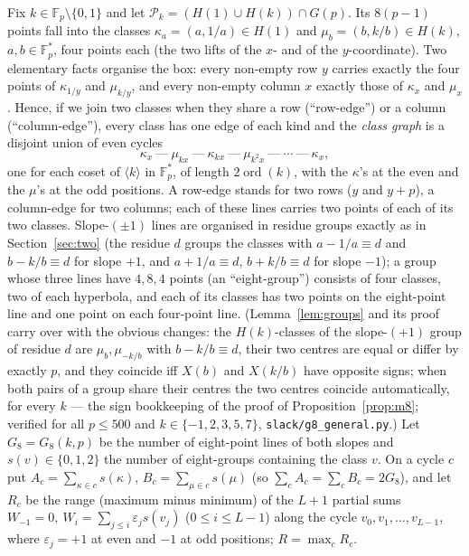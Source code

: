 \documentclass[11pt]{article}
\theoremstyle{remark}
\newcommand{\Fp}{\mathbb{F}_p}
\newcommand{\Gp}{G(p)}
\newcommand{\Pset}{\mathcal{P}}
\begin{document}
Fix $k\in\Fp\setminus\{0,1\}$ and let $\Pset_k=(H(1)\cup H(k))\cap\Gp$.  Its $8(p-1)$ points fall into the classes
$\kappa_a=(a,1/a)\in H(1)$ and $\mu_b=(b,k/b)\in H(k)$, $a,b\in\Fp^*$, four points each (the two lifts of the $x$- and of the
$y$-coordinate).  Two elementary facts organise the box: every non-empty row $y$ carries exactly the four points of $\kappa_{1/y}$ and
$\mu_{k/y}$, and every non-empty column $x$ exactly those of $\kappa_x$ and $\mu_x$.  Hence, if we join two classes when they share a row
(``row-edge'') or a column (``column-edge''), every class has one edge of each kind and the \emph{class graph} is a disjoint union of even
cycles
\[
 \kappa_x\ \text{---}\ \mu_{kx}\ \text{---}\ \kappa_{kx}\ \text{---}\ \mu_{k^2x}\ \text{---}\ \cdots\ \text{---}\ \kappa_x ,
\]
one for each coset of $\langle k\rangle$ in $\Fp^*$, of length $2\operatorname{ord}(k)$, with the $\kappa$'s at the even and the $\mu$'s at
the odd positions.  A row-edge stands for two rows ($y$ and $y+p$), a column-edge for two columns; each of these lines carries two points of
each of its two classes.  Slope-$(\pm1)$ lines are organised in residue groups exactly as in Section~\ref{sec:two} (the residue $d$ groups the
classes with $a-1/a\equiv d$ and $b-k/b\equiv d$ for slope $+1$, and $a+1/a\equiv d$, $b+k/b\equiv d$ for slope $-1$); a group whose three
lines have $4,8,4$ points (an ``eight-group'') consists of four classes, two of each hyperbola, and each of its classes has two points on the
eight-point line and one point on each four-point line.  (Lemma~\ref{lem:groups} and its proof carry over with the obvious changes: the $H(k)$-classes of the slope-$(+1)$ group of residue
$d$ are $\mu_b,\mu_{-k/b}$ with $b-k/b\equiv d$, their two centres are equal or differ by exactly $p$, and they coincide iff $X(b)$ and
$X(k/b)$ have opposite signs; when both pairs of a group share their centres the two centres coincide automatically, for every $k$ ---
the sign bookkeeping of the proof of Proposition~\ref{prop:m8}; verified for all $p\le500$ and $k\in\{-1,2,3,5,7\}$, \texttt{slack/g8\_general.py}.)  Let
$G_8=G_8(k,p)$ be the number of eight-point lines of both slopes and $s(v)\in\{0,1,2\}$ the number of eight-groups containing the class $v$.
On a cycle $c$ put $A_c=\sum_{\kappa\in c}s(\kappa)$, $B_c=\sum_{\mu\in c}s(\mu)$ (so $\sum_cA_c=\sum_cB_c=2G_8$), and let $R_c$ be the range
(maximum minus minimum) of the $L+1$ partial sums $W_{-1}=0,\ W_i=\sum_{j\le i}\varepsilon_js(v_j)$ ($0\le i\le L-1$) along the cycle
$v_0,v_1,\dots,v_{L-1}$, where $\varepsilon_j=+1$ at even and $-1$ at odd positions; $R=\max_cR_c$.
\end{document}
